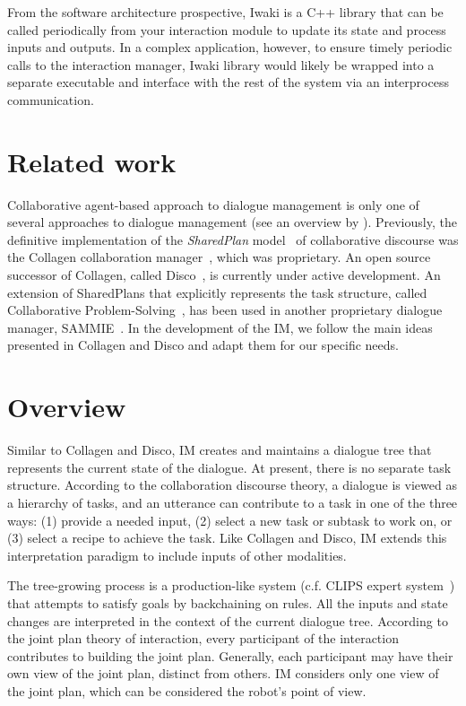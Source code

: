 From the software architecture prospective, Iwaki is a C++ library that can be called periodically from your interaction module to update its state and process inputs and outputs. In a complex application, however, to ensure timely periodic calls to the interaction manager, Iwaki library would likely be wrapped into a separate executable and interface with the rest of the system via an interprocess communication.

\section{Related work}

Collaborative agent-based approach to dialogue management is only one of several approaches to dialogue management (see an overview by \citet{Bui2006}). Previously, the definitive implementation of the \textsl{SharedPlan} model~\citep{GrozsSidner1990} of collaborative discourse was the Collagen collaboration manager~\citep{RichSidner1998}, which was proprietary. An open source successor of Collagen, called Disco~\citep{RichSidner2012}, is currently under active development. An extension of SharedPlans that explicitly represents the task structure, called Collaborative Problem-Solving~\citep{Blaylock2005}, has been used in another proprietary dialogue manager, SAMMIE~\citet{Becker2006}. In the development of the IM, we follow the main ideas presented in Collagen and Disco and adapt them for our specific needs.



\section{Overview}

Similar to Collagen and Disco, IM creates and maintains a dialogue tree that represents the current state of the dialogue. At present, there is no separate task structure. According to the collaboration discourse theory, a dialogue is viewed as a hierarchy of tasks, and an utterance can contribute to a task in one of the three ways: (1) provide a needed input, (2) select a new task or subtask to work on, or (3) select a recipe to achieve the task. Like Collagen and Disco, IM extends this interpretation paradigm to include inputs of other modalities. 

The tree-growing process is a production-like system (c.f. CLIPS expert system~\citep{CLIPS}) that attempts to satisfy goals by backchaining on rules.  All the inputs and state changes are interpreted in the context of the current dialogue tree. According to the joint plan theory of interaction, every participant of the interaction contributes to building the joint plan. Generally, each participant may have their own view of the joint plan, distinct from others. IM considers only one view of the joint plan, which can be considered the robot's point of view.

